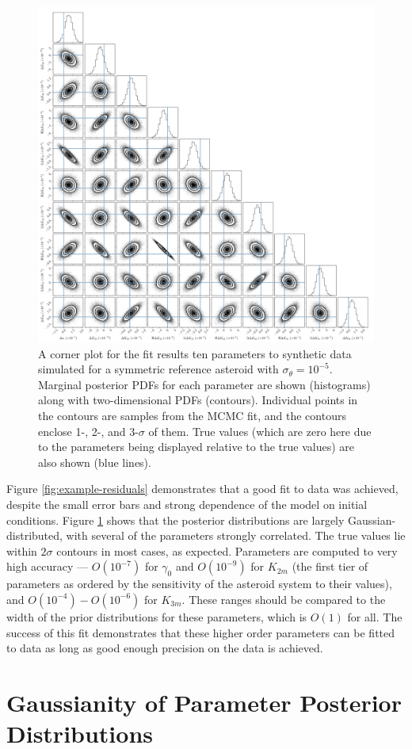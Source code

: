 \documentclass{aastex631}
\begin{document}
\begin{figure}
  \centering
  \includegraphics[width=\textwidth]{example-corner.pdf}
  \caption{A corner plot for the fit results ten parameters to synthetic data simulated for a symmetric reference asteroid with $\sigma_\theta = 10^{-5}$. Marginal posterior PDFs for each parameter are shown (histograms) along with two-dimensional PDFs (contours). Individual points in the contours are samples from the MCMC fit, and the contours enclose 1-, 2-, and 3-$\sigma$ of them. True values (which are zero here due to the parameters being displayed relative to the true values) are also shown (blue lines).}
  \label{fig:example-corner}
\end{figure}

Figure \ref{fig:example-residuals} demonstrates that a good fit to data was achieved, despite the small error bars and strong dependence of the model on initial conditions. Figure \ref{fig:example-corner} shows that the posterior distributions are largely Gaussian-distributed, with several of the parameters strongly correlated. The true values lie within $2\sigma$ contours in most cases, as expected. Parameters are computed to very high accuracy --- $O(10^{-7})$ for $\gamma_0$ and $O(10^{-9})$ for $K_{2m}$ (the first tier of parameters as ordered by the sensitivity of the asteroid system to their values), and $O(10^{-4})-O(10^{-6})$ for $K_{3m}$. These ranges should be compared to the width of the prior distributions for these parameters, which is $O(1)$ for all. The success of this fit demonstrates that these higher order parameters can be fitted to data as long as good enough precision on the data is achieved.



\section{Gaussianity of Parameter Posterior Distributions}
\label{app:gaussian-posteriors}



{}

\end{document}
